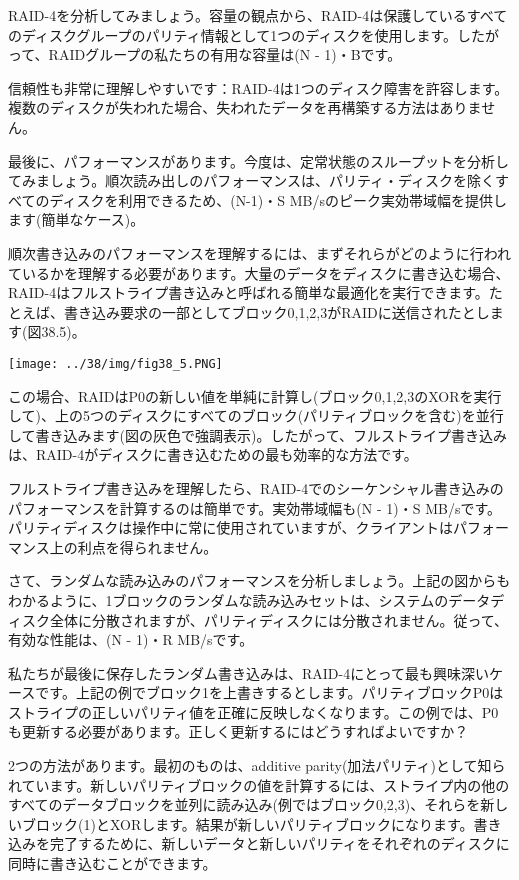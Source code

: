 RAID-4を分析してみましょう。容量の観点から、RAID-4は保護しているすべてのディスクグループのパリティ情報として1つのディスクを使用します。したがって、RAIDグループの私たちの有用な容量は(N
- 1)・Bです。

信頼性も非常に理解しやすいです：RAID-4は1つのディスク障害を許容します。複数のディスクが失われた場合、失われたデータを再構築する方法はありません。

最後に、パフォーマンスがあります。今度は、定常状態のスループットを分析してみましょう。順次読み出しのパフォーマンスは、パリティ・ディスクを除くすべてのディスクを利用できるため、(N-1)・S
MB/sのピーク実効帯域幅を提供します(簡単なケース)。

順次書き込みのパフォーマンスを理解するには、まずそれらがどのように行われているかを理解する必要があります。大量のデータをディスクに書き込む場合、RAID-4はフルストライプ書き込みと呼ばれる簡単な最適化を実行できます。たとえば、書き込み要求の一部としてブロック0,1,2,3がRAIDに送信されたとします(図38.5)。

\texttt{[image: ../38/img/fig38\_5.PNG]}

この場合、RAIDはP0の新しい値を単純に計算し(ブロック0,1,2,3のXORを実行して)、上の5つのディスクにすべてのブロック(パリティブロックを含む)を並行して書き込みます(図の灰色で強調表示)。したがって、フルストライプ書き込みは、RAID-4がディスクに書き込むための最も効率的な方法です。

フルストライプ書き込みを理解したら、RAID-4でのシーケンシャル書き込みのパフォーマンスを計算するのは簡単です。実効帯域幅も(N
- 1)・S
MB/sです。パリティディスクは操作中に常に使用されていますが、クライアントはパフォーマンス上の利点を得られません。

さて、ランダムな読み込みのパフォーマンスを分析しましょう。上記の図からもわかるように、1ブロックのランダムな読み込みセットは、システムのデータディスク全体に分散されますが、パリティディスクには分散されません。従って、有効な性能は、(N
- 1)・R MB/sです。

私たちが最後に保存したランダム書き込みは、RAID-4にとって最も興味深いケースです。上記の例でブロック1を上書きするとします。パリティブロックP0はストライプの正しいパリティ値を正確に反映しなくなります。この例では、P0も更新する必要があります。正しく更新するにはどうすればよいですか？

2つの方法があります。最初のものは、additive
parity(加法パリティ)として知られています。新しいパリティブロックの値を計算するには、ストライプ内の他のすべてのデータブロックを並列に読み込み(例ではブロック0,2,3)、それらを新しいブロック(1)とXORします。結果が新しいパリティブロックになります。書き込みを完了するために、新しいデータと新しいパリティをそれぞれのディスクに同時に書き込むことができます。


